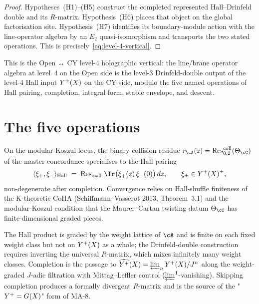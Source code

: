 \begin{proof}
Hypotheses~\textup{(H1)--(H5)} construct the completed represented
Hall--Drinfeld double and its $R$-matrix.  Hypothesis~\textup{(H6)}
places that object on the global factorisation site.
Hypothesis~\textup{(H7)} identifies its boundary-module action with
the line-operator algebra by an $E_2$ quasi-isomorphism and transports
the two stated operations.  This is precisely~\eqref{eq:level-4-vertical}.
\end{proof}

This is the Open ↔ CY level-$4$ holographic vertical: the line/brane
operator algebra at level~$4$ on the Open side is the level-$3$
Drinfeld-double output of the level-$4$ Hall input $Y^{+}(X)$ on the
CY side, modulo the five named operations of Hall pairing,
completion, integral form, stable envelope, and descent.

\section{The five operations}
\label{sec:five-operations}

\begin{construction}
\label{constr:hall-pairing}
On the modular-Koszul locus, the binary collision residue
$r_\cA(z) = \operatorname{Res}^{\mathrm{coll}}_{0,2}(\Theta_\cC)$ of
the master concordance specialises to the Hall pairing
\[
\langle\xi_+, \xi_-\rangle_{\mathrm{Hall}}
\;=\; \operatorname{Res}_{z=0}\,\Tr\bigl(\xi_+(z)\,\xi_-(0)\bigr)\,dz,
\qquad \xi_\pm \in \Yplus(X)^{\pm},
\]
non-degenerate after completion. Convergence relies on Hall-shuffle
finiteness of the K-theoretic CoHA (Schiffmann--Vasserot 2013,
Theorem~3.1) and the modular-Koszul condition that the
Maurer--Cartan twisting datum $\Theta_\cC$ has finite-dimensional
graded pieces.
\end{construction}

\begin{construction}
\label{constr:weight-completion}
The Hall product is graded by the weight lattice of $\cA$ and is
finite on each fixed weight class but not on $Y^{+}(X)$ as a whole;
the Drinfeld-double construction requires inverting the universal
$R$-matrix, which mixes infinitely many weight classes. Completion
is the passage to
$\widehat{Y^{+}}(X) = \varprojlim_n Y^{+}(X)/J^{n}$ along the
weight-graded $J$-adic filtration with Mittag--Leffler control
($\varprojlim^{1}$-vanishing). Skipping completion produces a
formally divergent $R$-matrix and is the source of the
"$Y^{+} = G(X)$" form of MA-$8$.
\end{construction}

